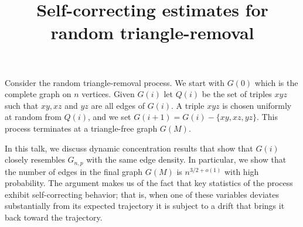 \documentclass{article}
\begin{document}
%
%
%
%
%
%
%

\title{Self-correcting estimates for random triangle-removal}
\endtitle
Consider the random triangle-removal process.  We
start with $G(0)$ which is the complete graph on
$n$ vertices.  Given $G(i)$ let $Q(i)$ be the set of
triples $xyz$ such that $xy,xz$ and $yz$ are all
edges of $G(i)$.  A triple $xyz$ is chosen uniformly
at random from $Q(i)$, and we set
$G(i+1) = G(i) - \{ xy,xz,yz \}$.  This process
terminates at a triangle-free graph $G(M)$.

In this talk, we discuss dynamic concentration
results that show that $G(i)$ closely resembles
$ G_{n,p} $ with the same edge density.  In
particular, we show that the number of edges in
the final graph $ G(M)$ is $ n^{3/2 + o(1)}$ with
high probability.  The argument makes us of the
fact that key statistics of the process exhibit
self-correcting behavior; that is, when one of
these variables deviates substantially from its
expected trajectory it is subject to a drift that
brings it back toward the trajectory.
\end{document}
